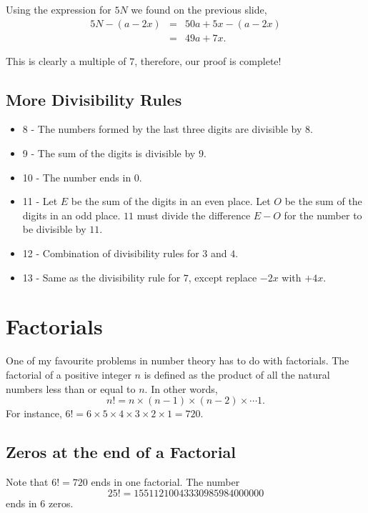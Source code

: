 Using the expression for $5N$ we found on the previous slide, \begin{eqnarray*} 5N-(a-2x) &=& 50a+5x-(a-2x) \\ &=& 49a+7x. \end{eqnarray*}

This is clearly a multiple of $7$, therefore, our proof is complete!  





\clearpage

\subsection{More Divisibility Rules}

\begin{itemize}
	\item  8 - The numbers formed by the last three digits are divisible by $8$.
	\item 9 - The sum of the digits is divisible by $9$.
	\item 10 - The number ends in $0$.
	\item 11 - Let $E$ be the sum of the digits in an even place. Let $O$ be the sum of the digits in an odd place. $11$ must divide the difference $E-O$ for the number to be divisible by $11$.
	\item 12 - Combination of divisibility rules for $3$ and $4$.
	\item 13 -  Same as the divisibility rule for $7$, except replace $-2x$ with $+4x$.  
\end{itemize}

\section{Factorials}

One of my favourite problems in number theory has to do with factorials. The factorial of a positive integer $n$ is defined as the product of all the natural numbers less than or equal to $n$. In other words, $$n!=n\times (n-1)\times (n-2)\times \cdots 1.$$  For instance, $6!=6\times 5\times 4\times 3\times 2\times 1=720$.

\subsection{Zeros at the end of a Factorial}

Note that $6!=720$ ends in one factorial.  The number $$25!=15511210043330985984000000$$ ends in $6$ zeros. 

